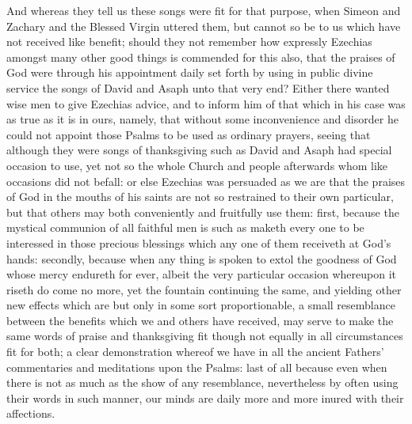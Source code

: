 And whereas they tell us these songs were fit for that purpose, when Simeon and Zachary and the Blessed Virgin uttered them, but cannot so be to us which have not received like benefit; should they not remember how expressly Ezechias amongst many other good things is commended for this also, that the praises of God were through his appointment daily set forth by using in public divine service the songs of David and Asaph unto that very end? Either there wanted wise men to give Ezechias advice, and to inform him of that which in his case was as true as it is in ours, namely, that without some inconvenience and disorder he could not appoint those Psalms to be used as ordinary prayers, seeing that although they were songs of thanksgiving such as David and Asaph had special occasion to use, yet not so the whole Church and people afterwards whom like occasions did not befall: or else Ezechias was persuaded as we are that the praises of God in the mouths of his saints are not so restrained to their own particular, but that others may both conveniently and fruitfully use them: first, because the mystical communion of all faithful men is such as maketh every one to be interessed in those precious blessings which any one of them receiveth at God’s hands: secondly, because when any thing is spoken to extol the goodness of God whose mercy endureth for ever, albeit the very particular occasion whereupon it riseth do come no more, yet the fountain continuing the same, and yielding other new effects which are but only in some sort proportionable, a small resemblance between the benefits which we and others have received, may serve to make the  same words of praise and thanksgiving fit though not equally in all circumstances fit for both; a clear demonstration whereof we have in all the ancient Fathers’ commentaries and meditations upon the Psalms: last of all because even when there is not as much as the show of any resemblance, nevertheless by often using their words in such manner, our minds are daily more and more inured with their affections.

